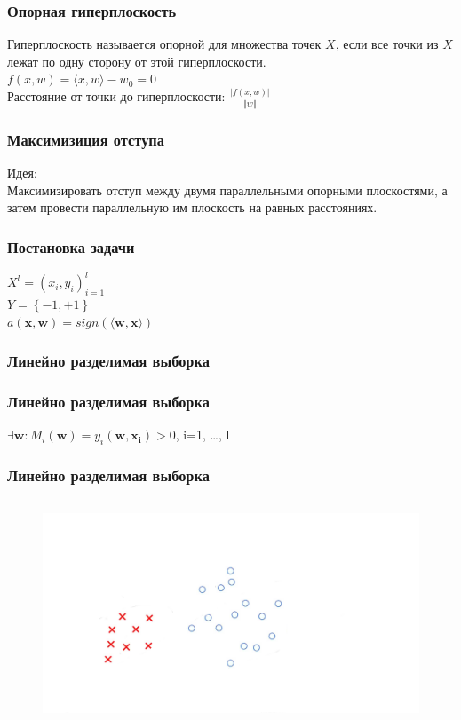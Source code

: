 \documentclass[12pt]{beamer}
\begin{document}
\begin{frame}\frametitle{Опорная гиперплоскость}
Гиперплоскость называется опорной для множества точек
$X$, если все точки из $X$ лежат по одну сторону от этой гиперплоскости.\\\vspace{5mm}
${f(x,w) = \langle x, w\rangle - w_0 = 0}$\\
\vspace{5mm}
Расстояние от точки до гиперплоскости:
$\frac{\vert f(x,w) \vert}{\Vert w \Vert}$
\end{frame}

\begin{frame}\frametitle{Максимизиция отступа}
Идея:\\
Максимизировать отступ между двумя параллельными опорными плоскостями, а затем провести параллельную им плоскость на равных расстояниях.\\
\end{frame}

\begin{frame}\frametitle{Постановка задачи}
${X^l = (x_i,y_i)_{i = 1}^l}$\\ 
${Y=\left\{-1,+1\right\}}$\\
\vspace{5mm}
$a(\mathbf{x}, \mathbf{w}) = sign(\langle \mathbf{w}, \mathbf{x}\rangle)$\\
\end{frame}


\begin{frame}\frametitle{Линейно разделимая выборка}
\end{frame}

\begin{frame}\frametitle{Линейно разделимая выборка}
$\exists \mathbf{w}: M_i(\mathbf{w}) = y_i(\mathbf{w}, \mathbf{x_i}) > 0$, i=1, \dots , l\\
\end{frame}

\begin{frame}\frametitle{Линейно разделимая выборка}
\begin{figure}[htbp]
  \includegraphics[height=190pt, keepaspectratio = true]{images/linearly_separable1}   
\end{figure}
\end{frame}
\end{document}
